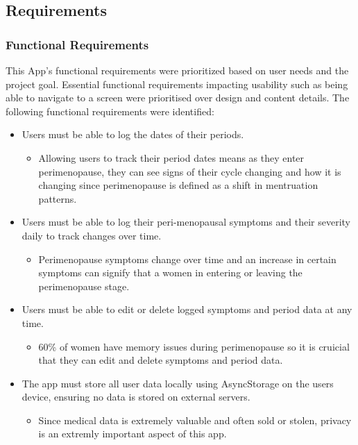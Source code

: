 \subsection{Requirements}

\subsubsection{Functional Requirements}
This App's functional requirements were prioritized based on user needs and the project goal. Essential functional requirements impacting usability such as being able to navigate to a screen were prioritised over design and content details. The following functional requirements were identified:

\begin{itemize}
      \item Users must be able to log the dates of their periods.
        \begin{itemize}
          \item Allowing users to track their period dates means as they enter perimenopause, they can see signs of their cycle changing and how it is changing since perimenopause is defined as a shift in mentruation patterns\cite{Brambilla1994}. 
        \end{itemize}
      \item Users must be able to log their peri-menopausal symptoms and their severity daily to track changes over time.
        \begin{itemize}
          \item Perimenopause symptoms change over time and an increase in certain symptoms can signify that a women in entering or leaving the perimenopause stage\cite{Brambilla1994}.
        \end{itemize}
      \item Users must be able to edit or delete logged symptoms and period data at any time.
        \begin{itemize}
          \item 60\% of women have memory issues during perimenopause so it is cruicial that they can edit and delete symptoms and period data\cite{Gilman2021}.
        \end{itemize} 
      \item The app must store all user data locally using AsyncStorage on the users device, ensuring no data is stored on external servers.
        \begin{itemize}
          \item Since medical data is extremely valuable and often sold or stolen, privacy is an extremly important aspect of this app\cite{Gilman2021}\cite{Rosato2020}.

\end{itemize}
\end{itemize}

